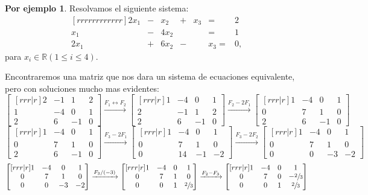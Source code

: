 \documentclass{article}
\theoremstyle{definition}
\theoremstyle{definition}
\newtheorem*{ej}{Por ejemplo}
\theoremstyle{remark}
\begin{document}
\begin{ej}
  Resolvamos el siguiente sistema: \[
 \begin{matrix}[rrrrrrrrrrrr]
     2x_1& - & x_2 & + &x_3 & = & 2 \\
        x_1  & - & 4x_2 &  & & = & 1 \\
     2x_1 & + & 6x_2 & - & &x_3 = & 0,
  \end{matrix}
  \]
  para $x_i \in \mathbb{R} (1 \leq i \leq 4).$
\end{ej}\pagebreak 

Encontraremos una matriz que nos dara un sistema de ecuaciones equivalente, pero con soluciones mucho mas evidentes: \[
  \begin{bmatrix}[rrr|r]
   2 & -1 & 1 & 2 \\
   1 & -4 & 0 & 1 \\
   2 & 6 & -1 & 0 
 \end{bmatrix}
\xrightarrow{F_1 \leftrightarrow F_2} 
\begin{bmatrix}[rrr|r]
   1 & -4 & 0 & 1 \\
   2 & -1 & 1 & 2 \\
   2 & 6 & -1 & 0 
 \end{bmatrix}
\xrightarrow{F_2 - 2F_1} 
\begin{bmatrix}[rrr|r]
   1 & -4 & 0 & 1 \\
   0 &  7 & 1 & 0 \\
   2 & 6 & -1 & 0 
\end{bmatrix}
\]
\[
\begin{bmatrix}[rrr|r]
   1 & -4 & 0 & 1 \\
   0 &  7 & 1 & 0 \\
   2 & 6 & -1 & 0 
\end{bmatrix}
\xrightarrow{F_3-2F_1} 
\begin{bmatrix}[rrr|r]
  1 & -4 & 0 & 1 \\
  0 & 7 & 1 & 0 \\
  0 & 14 & -1 & -2 
\end{bmatrix}
\xrightarrow{F_3-2F_2} 
\begin{bmatrix}[rrr|r]
  1 & -4 & 0 & 1 \\
  0 & 7 & 1 & 0 \\
  0 &  0 & -3 & -2 
\end{bmatrix}
\]
\[
\begin{bmatrix}[rrr|r]
  1 & -4 & 0 & 1 \\
  0 & 7 & 1 & 0 \\
  0 &  0 & -3 & -2 
\end{bmatrix}
\xrightarrow{F_3/(-3)}
\begin{bmatrix}[rrr|r]
  1 & -4 & 0 & 1 \\
  0 & 7 & 1 & 0 \\
  0 &  0 & 1 & \sfrac{2}{3} 
\end{bmatrix}
\xrightarrow{F_2-F_3}
\begin{bmatrix}[rrr|r]
  1 & -4 & 0 & 1 \\
  0 & 7 & 0 & -\sfrac{2}{3} \\
  0 &  0 & 1 & \sfrac{2}{3} 
\end{bmatrix}
\]
\end{document}
